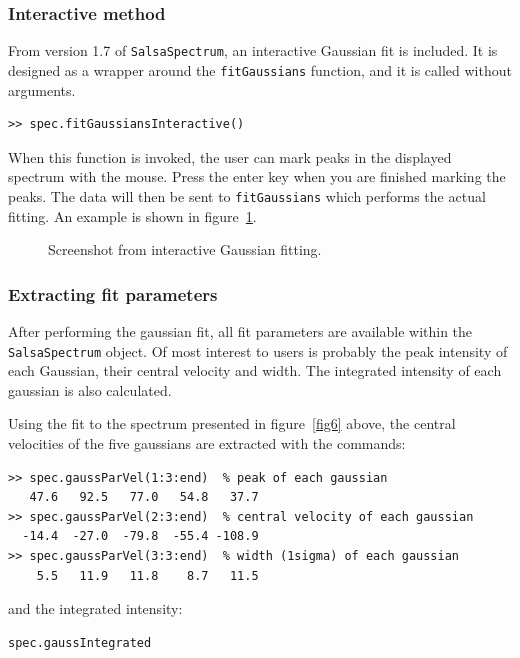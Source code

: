 \documentclass[11pt,a4paper]{article}
\begin{document}
\subsubsection{Interactive method}
\label{sec:interactive-method}

From version 1.7 of \texttt{SalsaSpectrum}, an interactive Gaussian
fit is included. It is designed as a wrapper around the
\texttt{fitGaussians} function, and it is called without arguments.
\begin{lstlisting}
>> spec.fitGaussiansInteractive()
\end{lstlisting}
When this function is invoked, the user can mark peaks in the
displayed spectrum with the mouse. Press the enter key when you are
finished marking the peaks. The data will then be sent to
\texttt{fitGaussians} which performs the actual fitting. An example is
shown in figure~\ref{fig:intergauss}.

\begin{figure}[h!]
  \centering
  \caption{Screenshot from interactive Gaussian fitting.}
  \label{fig:intergauss}
\end{figure}

\subsubsection{Extracting fit parameters}
\label{sec:extr-fit-param}

After performing the gaussian fit, all fit parameters are available
within the \texttt{SalsaSpectrum} object. Of most interest to users is
probably the peak intensity of each Gaussian, their central velocity
and width. The integrated intensity of each gaussian is also
calculated.

Using the fit to the spectrum presented in figure~\ref{fig6} above,
the central velocities of the five gaussians are extracted with the
commands:
\begin{lstlisting}
>> spec.gaussParVel(1:3:end)  % peak of each gaussian
   47.6   92.5   77.0   54.8   37.7
>> spec.gaussParVel(2:3:end)  % central velocity of each gaussian
  -14.4  -27.0  -79.8  -55.4 -108.9
>> spec.gaussParVel(3:3:end)  % width (1sigma) of each gaussian
    5.5   11.9   11.8    8.7   11.5
\end{lstlisting}
and the integrated intensity:
\begin{lstlisting}
spec.gaussIntegrated
\end{lstlisting}
\end{document}
